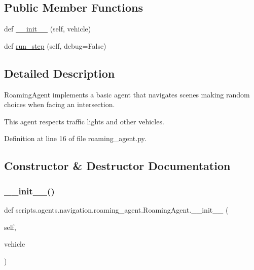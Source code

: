 \subsection*{Public Member Functions}
\begin{DoxyCompactItemize}
\item 
def \hyperlink{classscripts_1_1agents_1_1navigation_1_1roaming__agent_1_1RoamingAgent_a6e363052495fd0e0a740ba9fd9595edf}{\+\_\+\+\_\+init\+\_\+\+\_\+} (self, vehicle)
\item 
def \hyperlink{classscripts_1_1agents_1_1navigation_1_1roaming__agent_1_1RoamingAgent_a9b407a197c9f5bb59c4d18bd5508528e}{run\+\_\+step} (self, debug=False)
\end{DoxyCompactItemize}


\subsection{Detailed Description}
\begin{DoxyVerb}RoamingAgent implements a basic agent that navigates scenes making random
choices when facing an intersection.

This agent respects traffic lights and other vehicles.
\end{DoxyVerb}
 

Definition at line 16 of file roaming\+\_\+agent.\+py.



\subsection{Constructor \& Destructor Documentation}
\mbox{\label{classscripts_1_1agents_1_1navigation_1_1roaming__agent_1_1RoamingAgent_a6e363052495fd0e0a740ba9fd9595edf}} 
\subsubsection{\texorpdfstring{\+\_\+\+\_\+init\+\_\+\+\_\+()}{\_\_init\_\_()}}
{\footnotesize\ttfamily def scripts.\+agents.\+navigation.\+roaming\+\_\+agent.\+Roaming\+Agent.\+\_\+\+\_\+init\+\_\+\+\_\+ (\begin{DoxyParamCaption}\item[{}]{self,  }\item[{}]{vehicle }\end{DoxyParamCaption})}

